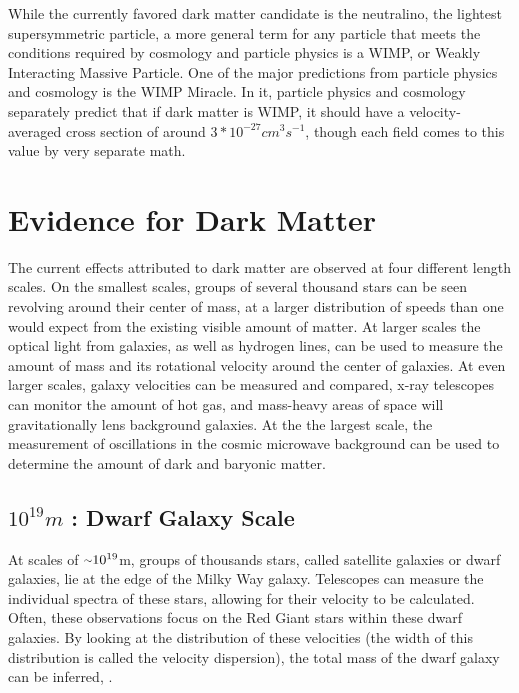 While the currently favored dark matter candidate is the neutralino, the lightest supersymmetric particle, a more general term for any particle that meets the conditions required by cosmology and particle physics is a WIMP, or Weakly Interacting Massive Particle.
One of the major predictions from particle physics and cosmology is the WIMP Miracle.
In it, particle physics and cosmology separately predict that if dark matter is WIMP, it should have a velocity-averaged cross section of around $3*10^{-27}cm^{3}s^{-1}$, though each field comes to this value by very separate math.


\section{Evidence for Dark Matter}

The current effects attributed to dark matter are observed at four different length scales.
On the smallest scales, groups of several thousand stars can be seen revolving around their center of mass, at a larger distribution of speeds than one would expect from the existing visible amount of matter.
At larger scales the optical light from galaxies, as well as hydrogen lines, can be used to measure the amount of mass and its rotational velocity around the center of galaxies.
At even larger scales, galaxy velocities can be measured and compared, x-ray telescopes can monitor the amount of hot gas, and mass-heavy areas of space will gravitationally lens background galaxies.
At the the largest scale, the measurement of oscillations in the cosmic microwave background can be used to determine the amount of dark and baryonic matter.

\subsection{$10^{19}m$ : Dwarf Galaxy Scale}
At scales of $\nicetilde 10^{19}$m, groups of thousands stars, called satellite galaxies or dwarf galaxies, lie at the edge of the Milky Way galaxy.
Telescopes can measure the individual spectra of these stars, allowing for their velocity to be calculated.
Often, these observations focus on the Red Giant stars within these dwarf galaxies\cite{dwarf_gal_red_giant}.
By looking at the distribution of these velocities (the width of this distribution is called the velocity dispersion), the total mass of the dwarf galaxy can be inferred\cite{dwarf_gal_vel_dispersion}, \cite{dwarf_gal_vel_dispersion2}.

